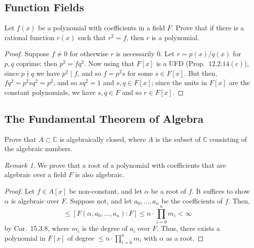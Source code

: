 \documentclass[12pt]{article}
\theoremstyle{remark}
\newtheorem*{remark}{Remark}
\begin{document}
\subsection{Function Fields}
\begin{problem}
  Let $f(x)$ be a polynomial with coefficients in a field $F$. Prove that if there is a rational function $r(x)$ such that $r^2 = f$, then $r$ is a polynomial.
\end{problem}
\begin{proof}
  Suppose $f \ne 0$ for otherwise $r$ is necessarily $0$. Let $r = p(x)/q(x)$ for $p,q$ coprime; then $p^2 = fq^2$. Now using that $F[x]$ is a UFD (Prop.~$12.2.14(c)$), since $p \nmid q$ we have $p^2 \mid f$, and so $f = p^2s$ for some $s \in F[x]$. But then, $fq^2 = p^2sq^2 = p^2$, and so $sq^2 = 1$ and $s,q \in F[x]$; since the units in $F[x]$ are the constant polynomials, we have $s,q \in F$ and so $r \in F[x]$.
\end{proof}

\subsection{The Fundamental Theorem of Algebra}
\begin{problem}\label{exc:15.10.1}
  Prove that $A \subset \mathbb{C}$ is algebraically closed, where $A$ is the subset of $\mathbb{C}$ consisting of the algebraic numbers.
\end{problem}
\begin{remark}
  We prove that a root of a polynomial with coefficients that are algebraic over a field $F$ is also algebraic.
\end{remark}
\begin{proof}
  Let $f \in A[x]$ be non-constant, and let $\alpha$ be a root of $f$. It suffices to show $\alpha$ is algebraic over $F$. Suppose not, and let $a_0,\ldots,a_n$ be the coefficients of $f$. Then,
  \begin{equation*}
    [F(\alpha):F] \le [F(\alpha,a_0,\ldots,a_n) : F] \le n \cdot \prod_{i=0}^n m_i < \infty
  \end{equation*}
  by Cor.~15.3.8, where $m_i$ is the degree of $a_i$ over $F$. Thus, there exists a polynomial in $F[x]$ of degree $\le n \cdot \prod_{i=0}^n m_i$ with $\alpha$ as a root.
\end{proof}
\end{document}
